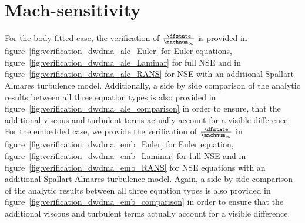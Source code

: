 \documentclass[../main.tex]{subfiles}
\begin{document}
\section{Mach-sensitivity}
For the body-fitted case, the verification of $\tfrac{\dfstate}{\machnum_{\infty}}$ is provided in figure~\ref{fig:verification_dwdma_ale_Euler} for Euler equations, figure~\ref{fig:verification_dwdma_ale_Laminar} for full \ac{NSE} and in figure~\ref{fig:verification_dwdma_ale_RANS} for \ac{NSE} with an additional Spallart-Almares turbulence model.
Additionally, a side by side comparison of the analytic results between all three equation types is also provided in figure~\ref{fig:verification_dwdma_ale_comparison} in order to ensure, that the additional viscous and turbulent terms actually account for a visible difference.\\
For the embedded case, we provide the verification of $\tfrac{\dfstate}{\machnum_{\infty}}$  in figure~\ref{fig:verification_dwdma_emb_Euler} for Euler equation, figure~\ref{fig:verification_dwdma_emb_Laminar} for full \ac{NSE} and in figure~\ref{fig:verification_dwdma_emb_RANS} for \ac{NSE} equations with an additional Spallart-Almares turbulence model.
Again, a side by side comparison of the analytic results between all three equation types is also provided in figure~\ref{fig:verification_dwdma_emb_comparison} in order to ensure that the additional viscous and turbulent terms actually account for a visible difference.
\end{document}
